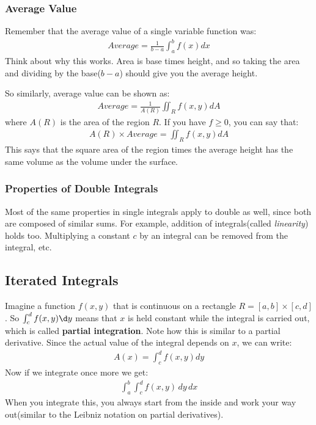 \documentclass{article}
\begin{document}
\subsubsection{Average Value}
Remember that the average value of a single variable function was:
\begin{gather*}
    Average = \frac{1}{b - a}\int_a^b f(x) dx
\end{gather*}
Think about why this works. Area is base times height, and so taking the area and dividing by the base($b-a$) should give you the average height.

So similarly, average value can be shown as:
\begin{gather*}
    Average = \frac{1}{A(R)}\iint_R f(x,y) dA
\end{gather*}
where $A(R)$ is the area of the region $R$. If you have $f \geqslant 0$, you can say that:
\begin{gather*}
    A(R) \times Average = \iint_R f(x,y) dA
\end{gather*}
This says that the square area of the region times the average height has the same volume as the volume under the surface.
\subsubsection{Properties of Double Integrals}
Most of the same properties in single integrals apply to double as well, since both are composed of similar sums. For example, addition of integrals(called \textit{linearity}) holds too. Multiplying a constant $c$ by an integral can be removed from the integral, etc.
\subsection{Iterated Integrals}
Imagine a function $f(x,y)$ that is continuous on a rectangle $R = [a,b] \times [c,d]$. So $\int_c^d f(x,y) \d y$ means that $x$ is held constant while the integral is carried out, which is called \textbf{partial integration}. Note how this is similar to a partial derivative. Since the actual value of the integral depends on $x$, we can write:
\begin{gather*}
    A(x) = \int_c^d f(x,y) dy
\end{gather*}
Now if we integrate once more we get:
\begin{gather*}
    \int_a^b \int_c^d f(x,y) \,dy \,dx
\end{gather*}
When you integrate this, you always start from the inside and work your way out(similar to the Leibniz notation on partial derivatives).
\end{document}
